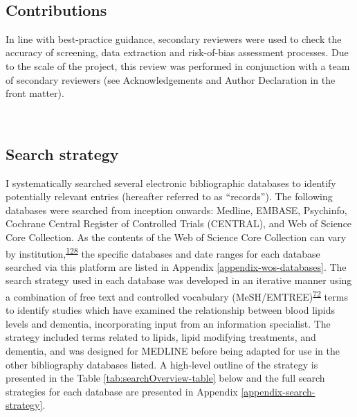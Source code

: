 \documentclass[a4paper, twoside]{templates/ociamthesis}
\begin{document}
~

\hypertarget{contributions}{%
\subsection{Contributions}\label{contributions}}

In line with best-practice guidance, secondary reviewers were used to check the accuracy of screening, data extraction and risk-of-bias assessment processes. Due to the scale of the project, this review was performed in conjunction with a team of secondary reviewers (see Acknowledgements and Author Declaration in the front matter).

~

\hypertarget{search-strategy}{%
\subsection{Search strategy}\label{search-strategy}}

I systematically searched several electronic bibliographic databases to identify potentially relevant entries (hereafter referred to as ``records''). The following databases were searched from inception onwards: Medline, EMBASE, Psychinfo, Cochrane Central Register of Controlled Trials (CENTRAL), and Web of Science Core Collection. As the contents of the Web of Science Core Collection can vary by institution,\textsuperscript{\protect\hyperlink{ref-gusenbauer2020a}{128}} the specific databases and date ranges for each database searched via this platform are listed in Appendix \ref{appendix-wos-databases}. The search strategy used in each database was developed in an iterative manner using a combination of free text and controlled vocabulary (MeSH/EMTREE)\textsuperscript{\protect\hyperlink{ref-lefebvre2019searching}{72}} terms to identify studies which have examined the relationship between blood lipids levels and dementia, incorporating input from an information specialist. The strategy included terms related to lipids, lipid modifying treatments, and dementia, and was designed for MEDLINE before being adapted for use in the other bibliography databases listed. A high-level outline of the strategy is presented in the Table \ref{tab:searchOverview-table} below and the full search strategies for each database are presented in Appendix \ref{appendix-search-strategy}.

~
\end{document}
